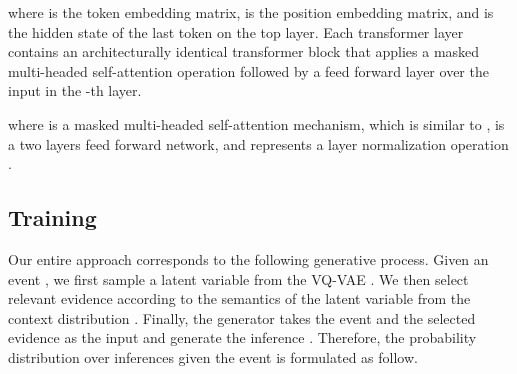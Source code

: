 \documentclass[11pt,a4paper]{article}
\begin{document}
where  is the token embedding matrix,  is the position embedding matrix, and  is the hidden state of the last token on the top layer. Each transformer layer  contains an architecturally identical transformer block that applies a masked multi-headed self-attention operation followed by a feed forward layer over the input  in the -th layer.  

where  is a masked multi-headed self-attention mechanism, which is similar to \citet{vaswani2017attention},  is a two layers feed forward network, and  represents a layer normalization operation \cite{ba2016layer}. 


\begin{comment}
\paragraph{Masked Multi-headed Self Attention} The multi-headed attention mechanism is identical to \cite{vaswani2017attention}, which maps query  and a set of key  and value  pairs to an output . The mechanism allows the model to jointly acquire information from values through the query by multi-head attention, which is formulated as follows:

where  is the number of heads in the multi-head attention layer and  is an output projection of the concatenation of multiple attention heads. Each attention heads  computes a scaled dot product attention distribution over V using Q and K: 


where the projections , , and  are -th head-specific projections and  is dimension of the input.

At each time-step , we follow \citet{radford2019language} to obtain the output of masked multi-headed self attention in the -th layer.

where  is the output of the previous layer’s transformer block at -th time step,  is the set of the previous layer’s block outputs for all preceding -th time steps, and  is the number of time steps.





\end{comment}

\subsection{Training}
\label{training}
Our entire approach corresponds to the following generative process. Given an event , we first sample a latent variable  from the VQ-VAE . We then select relevant evidence  according to the semantics of the latent variable from the context distribution . Finally, the generator  takes the event  and the selected evidence  as the input and generate the inference . Therefore, the probability distribution  over inferences  given the event  is formulated as follow. 
\end{document}
